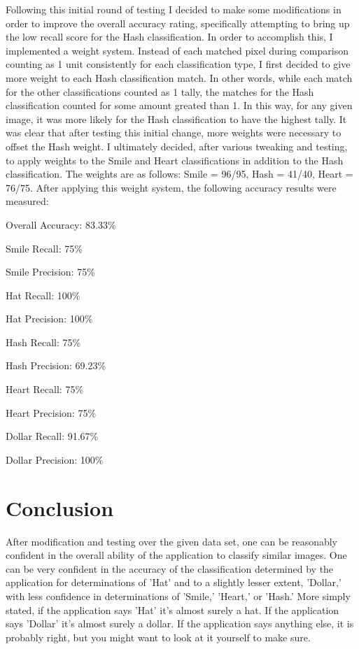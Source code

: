 \documentclass[11pt]{article} %
\begin{document}
Following this initial round of testing I decided to make some modifications in order to improve the overall accuracy rating, specifically attempting to bring up the low recall score for the Hash classification. In order to accomplish this, I implemented a weight system. Instead of each matched pixel during comparison counting as 1 unit consistently for each classification type, I first decided to give more weight to each Hash classification match. In other words, while each match for the other classifications counted as 1 tally, the matches for the Hash classification counted for some amount greated than 1. In this way, for any given image, it was more likely for the Hash classification to have the highest tally. It was clear that after testing this initial change, more weights were necessary to offset the Hash weight. I ultimately decided, after various tweaking and testing, to apply weights to the Smile and Heart classifications in addition to the Hash classification. The weights are as follows: Smile = 96/95, Hash = 41/40, Heart = 76/75. After applying this weight system, the following accuracy results were measured:

Overall Accuracy: 83.33\%

Smile Recall: 75\%

Smile Precision: 75\%

Hat Recall: 100\%

Hat Precision: 100\%

Hash Recall: 75\%

Hash Precision: 69.23\%

Heart Recall: 75\%

Heart Precision: 75\%

Dollar Recall: 91.67\%

Dollar Precision: 100\%

\section{Conclusion}

After modification and testing over the given data set, one can be reasonably confident in the overall ability of the application to classify similar images. One can be very confident in the accuracy of the classification determined by the application for determinations of 'Hat' and to a slightly lesser extent, 'Dollar,' with less confidence in determinations of 'Smile,' 'Heart,' or 'Hash.' More simply stated, if the application says 'Hat' it's almost surely a hat. If the application says 'Dollar' it's almost surely a dollar. If the application says anything else, it is probably right, but you might want to look at it yourself to make sure.
\end{document}
